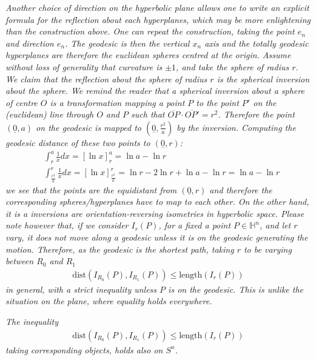 \begin{oss}
	\em Another choice of direction on the hyperbolic plane allows one to write an explicit formula for the reflection about each hyperplanes, which may be more enlightening than the construction above. One can repeat the construction, taking the point $e_n$ and direction $e_n$. The geodesic is then the vertical $x_n$ axis and the totally geodesic hyperplanes are therefore the euclidean spheres centred at the origin. Assume without loss of generality that curvature is $\pm 1$, and take the sphere of radius $r$. We claim that the reflection about the sphere of radius $r$ is the spherical inversion about the sphere. We remind the reader that a spherical inversion about a sphere of centre $O$ is a transformation mapping a point $P$ to the point $P'$ on the (euclidean) line through $O$ and $P$ such that $\overline{OP}\cdot \overline{OP'} = r^2$. Therefore the point $(\underline{0}, a)$ on the geodesic is mapped to $(\underline{0}, \frac{r^2}{a})$ by the inversion. Computing the geodesic distance of these two points to  $(\underline{0}, r)$:
	\begin{align*}
		&\int_{r}^{a} \frac{1}{x} dx = \left[\ln{x} \right]_{r}^{a} = \ln{a} - \ln{r} \\
		&\int_{\frac{r^2}{a}}^{r} \frac{1}{x} dx = \left[\ln{x} \right]_{\frac{r^2}{a}}^{r} = \ln{r} - 2 \ln{r} + \ln{a} - \ln{ r} = \ln{a} - \ln{r}
	\end{align*}
	we see that the points are the equidistant from $(\underline{0}, r)$ and therefore the corresponding spheres/hyperplanes have to map to each other. On the other hand, it is a inversions are orientation-reversing isometries in hyperbolic space. Please note however that, if we consider $I_r(P)$, for a fixed a point $P\in \mathbb{H}^n$, and let $r$ vary, it does not move along a geodesic unless it is on the geodesic generating the motion. Therefore, as the geodesic is the shortest path, taking $r$ to be varying between $R_0$ and $R_1$
	\begin{align*}
		\mathrm{dist}(I_{R_0}(P), I_{R_1}(P)) \leq \mathrm{length} (I_r(P))
	\end{align*}
	in general, with a strict inequality unless $P$ is on the geodesic. This is unlike the situation on the plane, where equality holds everywhere. 
\end{oss}
\begin{oss}
	\em The inequality
	\begin{align}
		\mathrm{dist}(I_{R_0}(P), I_{R_1}(P)) \leq \mathrm{length} (I_r(P))
	\end{align}
	taking corresponding objects, holds also on $S^n$. 
\end{oss}

